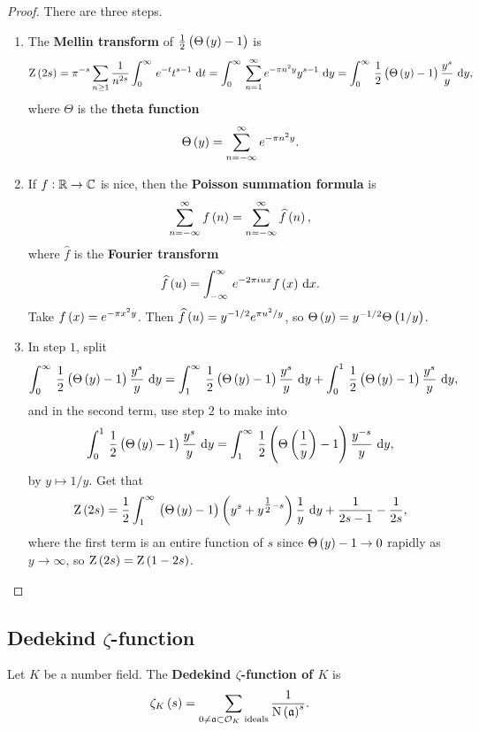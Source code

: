 \begin{proof}
There are three steps.
\begin{enumerate}[leftmargin=0.5in, label=Step \arabic*.]
\item The \textbf{Mellin transform} of $ \tfrac{1}{2}\br{\Theta\br{y} - 1} $ is
$$ \Z\br{2s} = \pi^{-s}\sum_{n \ge 1} \dfrac{1}{n^{2s}}\intd{0}{\infty}{e^{-t}t^{s - 1}}{t} = \intd{0}{\infty}{\sum_{n = 1}^\infty e^{-\pi n^2y}y^{s - 1}}{y} = \intd{0}{\infty}{\dfrac{1}{2}\br{\Theta\br{y} - 1}\dfrac{y^s}{y}}{y}, $$
where $ \Theta $ is the \textbf{theta function}
$$ \Theta\br{y} = \sum_{n = -\infty}^\infty e^{-\pi n^2y}. $$
\item If $ f : \mathbb{R} \to \mathbb{C} $ is nice, then the \textbf{Poisson summation formula} is
$$ \sum_{n = -\infty}^\infty f\br{n} = \sum_{n = -\infty}^\infty \widehat{f}\br{n}, $$
where $ \widehat{f} $ is the \textbf{Fourier transform}
$$ \widehat{f}\br{u} = \intd{-\infty}{\infty}{e^{-2\pi iux}f\br{x}}{x}. $$
Take $ f\br{x} = e^{-\pi x^2y} $. Then $ \widehat{f}\br{u} = y^{-1 / 2}e^{\pi u^2 / y} $, so $ \Theta\br{y} = y^{-1 / 2}\Theta\br{1 / y} $.
\item In step $ 1 $, split
$$ \intd{0}{\infty}{\dfrac{1}{2}\br{\Theta\br{y} - 1}\dfrac{y^s}{y}}{y} = \intd{1}{\infty}{\dfrac{1}{2}\br{\Theta\br{y} - 1}\dfrac{y^s}{y}}{y} + \intd{0}{1}{\dfrac{1}{2}\br{\Theta\br{y} - 1}\dfrac{y^s}{y}}{y}, $$
and in the second term, use step $ 2 $ to make into
$$ \intd{0}{1}{\dfrac{1}{2}\br{\Theta\br{y} - 1}\dfrac{y^s}{y}}{y} = \intd{1}{\infty}{\dfrac{1}{2}\br{\Theta\br{\dfrac{1}{y}} - 1}\dfrac{y^{-s}}{y}}{y}, $$
by $ y \mapsto 1 / y $. Get that
$$ \Z\br{2s} = \dfrac{1}{2}\intd{1}{\infty}{\br{\Theta\br{y} - 1}\br{y^s + y^{\tfrac{1}{2} - s}}\dfrac{1}{y}}{y} + \dfrac{1}{2s - 1} - \dfrac{1}{2s}, $$
where the first term is an entire function of $ s $ since $ \Theta\br{y} - 1 \to 0 $ rapidly as $ y \to \infty $, so $ \Z\br{2s} = \Z\br{1 - 2s} $.
\end{enumerate}
\end{proof}

\pagebreak

\subsection{Dedekind \texorpdfstring{$ \zeta $}{zeta}-function}

Let $ K $ be a number field. The \textbf{Dedekind $ \zeta $-function of $ K $} is
$$ \zeta_K\br{s} = \sum_{0 \ne \aaa \subset \OOO_K \ \text{ideals}} \dfrac{1}{\N\br{\aaa}^s}. $$

